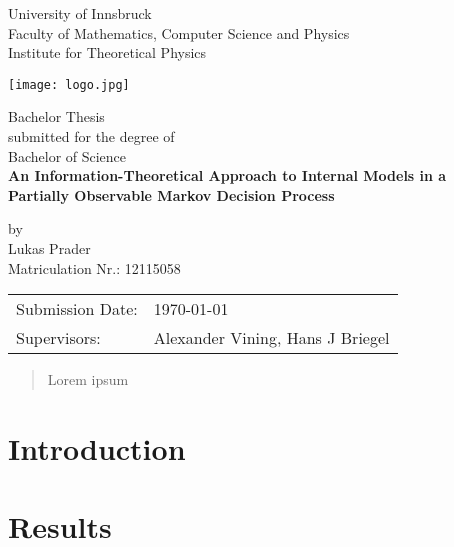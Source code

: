 \documentclass[a4paper,DIV=13,11pt,UKenglish,titlepage=firstiscover,abstract=on]{scrreprt}
\begin{document}
\def\findate{\today}


\thispagestyle{empty}
\begin{center}
    \Large{University of Innsbruck \\ Faculty of Mathematics, Computer Science and Physics} \\
    \vspace{3mm}
    \large{Institute for Theoretical Physics}
    \vspace{10mm}

    \texttt{[image: logo.jpg]}

    \vspace{10mm}
    \Large{Bachelor Thesis} \\
    \large{submitted for the degree of} \\
    \Large{Bachelor of Science} \\
    \vspace{10mm}
    \LARGE{\textbf{An Information-Theoretical Approach to Internal Models in a Partially Observable Markov Decision Process}} \\
    \vspace{10mm}

    \large{by \\ Lukas Prader \\ Matriculation Nr.: 12115058}
\end{center}

\vspace{30mm}
\begin{tabular}{ll}
    \large{Submission Date:} & \large{\findate}                          \\
    \large{Supervisors:}     & \large{Alexander Vining, Hans J  Briegel} \\
\end{tabular}


\newpage
\thispagestyle{empty}
\begin{abstract}
    Lorem ipsum
\end{abstract}


\tableofcontents

\clearpage
{}

\chapter{Introduction} \label{chap:introduction}


\chapter{Results} \label{chap:results}
\end{document}
